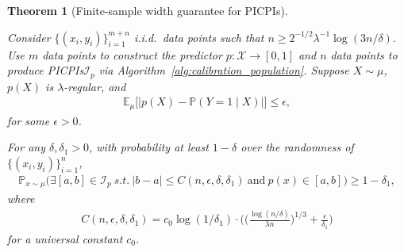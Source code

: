 \documentclass[11pt]{article}
\theoremstyle{statplain}
\newtheorem{theorem}{Theorem}[section]
\theoremstyle{statdefinition}
\newcommand{\Z}{\mathbb{Z}}
\newcommand{\E}{\mathbb{E}}
\newcommand{\PP}{\mathbb{P}}
\newcommand{\0}{\mathbf{0}}
\newcommand{\I}{\mathcal{I}}
\newcommand{\X}{\mathcal{X}}
\newcommand{\Xuelin}[1]{{\color{myGold}[Xuelin: #1]}}
\newcommand{\intervalset}{\I} %
\newcommand{\estModel}{p} %
\newcommand{\titleShorts}{PICPIs\xspace}
\begin{document}


\begin{theorem}%
[Finite-sample width guarantee for \titleShorts]
\label{thm:consistency-prediction}

Consider $\{(x_i,y_i)\}_{i=1}^{m+n}$  i.i.d.\ data points such that 
$n \geq 2^{-1/2} \lambda^{-1} \log(3n/\delta) $.
Use $m$ data points to construct the predictor $\estModel: \X \to [0,1]$ and $n$ data points to produce \titleShorts $\intervalset_p$  via Algorithm~\ref{alg:calibration_population}. 
Suppose $X \sim \mu$, $\estModel(X)$ is $\lambda$-regular, and
\begin{align*}
    \E_\mu\Big[\Big| \estModel (X) - \PP(Y = 1 \mid X)\Big|\Big] \leq \epsilon,
\end{align*}
for some $\epsilon>0$.

For any $\delta,\delta_1 > 0$, with probability at least $1-\delta$ over the randomness of $\{(x_i,y_i)\}_{i=1}^n$,
\begin{align}
    \PP_{x \sim \mu}\Big(\exists [a,b] \in \intervalset_p ~s.t.~ |b-a| \leq C(n,\epsilon,\delta,\delta_1) ~\text{and}~ p(x) \in [a,b] \Big) \geq 1-\delta_1,
\end{align}
where 
\begin{align}\label{eq:width_function}
    C(n,\epsilon,\delta,\delta_1) = c_0 \log(1/\delta_1) \cdot \Big(\Big(\frac{\log(n/\delta)}{\lambda n}\Big)^{1/3}  + \frac{\epsilon}{\delta_1}\Big)
\end{align}
for a universal constant $c_0$.


\end{theorem}
\end{document}
